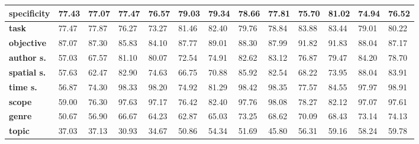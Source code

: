 \begin{tabular}{|l|l|l|l|l|l|l|l|l|l|l|l|l|}
\hline
\textbf{specificity}&77.43&77.07&77.47&76.57&79.03&79.34&78.66&77.81&75.70&81.02&74.94&76.52\\\hline
\textbf{task}&77.47&77.87&76.27&73.27&81.46&82.40&79.76&78.84&83.88&83.44&79.01&80.22\\\hline
\textbf{objective}&87.07&87.30&85.83&84.10&87.77&89.01&88.30&87.99&91.82&91.83&88.04&87.17\\\hline
\textbf{author s.}&57.03&67.57&81.10&80.07&72.54&74.91&82.62&83.12&76.87&79.47&84.20&78.70\\\hline
\textbf{spatial s.}&57.63&62.47&82.90&74.63&66.75&70.88&85.92&82.54&68.22&73.95&88.04&83.91\\\hline
\textbf{time s.}&56.87&74.30&98.33&98.20&74.92&81.29&98.42&98.35&77.57&84.55&97.97&98.91\\\hline
\textbf{scope}&59.00&76.30&97.63&97.17&76.42&82.40&97.76&98.08&78.27&82.12&97.07&97.61\\\hline
\textbf{genre}&50.67&56.90&66.67&64.23&62.87&65.03&73.25&68.62&70.09&68.43&73.14&74.13\\\hline
\textbf{topic}&37.03&37.13&30.93&34.67&50.86&54.34&51.69&45.80&56.31&59.16&58.24&59.78\\\hline
\end{tabular}
